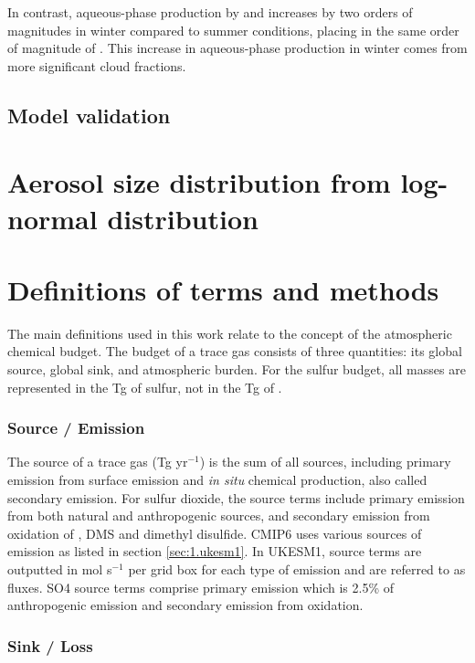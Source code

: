 In contrast, aqueous-phase production by  and  increases by two orders of magnitudes in winter compared to summer conditions, placing  in the same order of magnitude of . This increase in aqueous-phase production in winter comes from more significant cloud fractions. 


\subsection{Model validation}



\section{Aerosol size distribution from log-normal distribution}


\section{Definitions of terms and methods}
\label{sec:2.terms}
The main definitions used in this work relate to the concept of the atmospheric chemical budget. The budget of a trace gas consists of three quantities: its global source, global sink, and atmospheric burden. For the sulfur budget, all masses are represented in the Tg of sulfur, not in the Tg of .

\subsubsection{Source / Emission}

The source of a trace gas (Tg yr$^{-1}$) is the sum of all sources, including primary emission from surface emission and \textit{in situ} chemical production, also called secondary emission. For sulfur dioxide, the source terms include primary emission from both natural and anthropogenic sources, and secondary emission from oxidation of , DMS and dimethyl disulfide. CMIP6 uses various sources of  emission as listed in section \ref{sec:1.ukesm1}. In UKESM1, source terms are outputted in mol s$^{-1}$ per grid box for each type of emission and are referred to as fluxes. SO4 source terms comprise primary emission which is 2.5\% of anthropogenic  emission and secondary emission from  oxidation.

\subsubsection{Sink / Loss}

